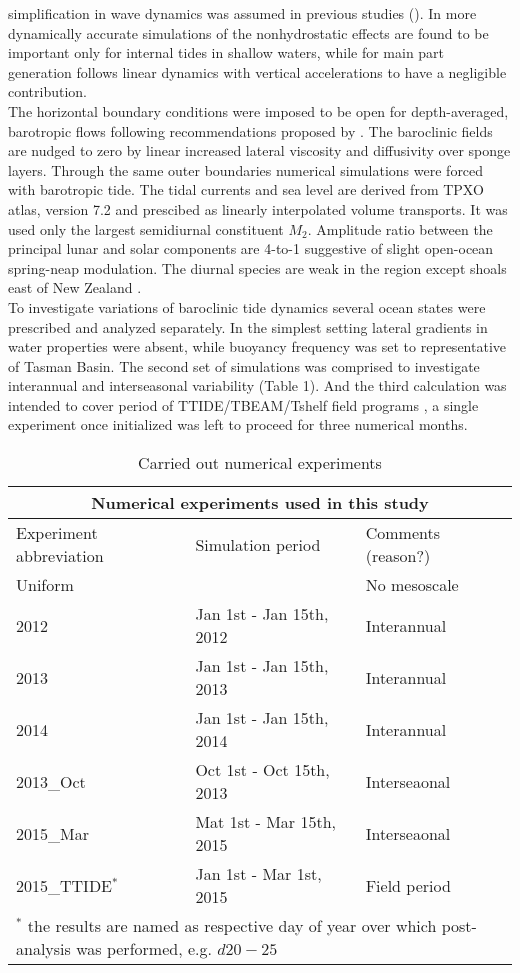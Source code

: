 \documentclass[12pt]{article}
\begin{document}
simplification in wave dynamics was assumed in previous studies (\citep{carter2008energetics, 
merrifield2001generation,  merrifield2002model, kerry2013effects}). In more dynamically accurate   
simulations of \citep{kang2012energetics, zhang2011three} the nonhydrostatic effects are found to 
be important only for internal tides in shallow waters, while for main part generation follows 
linear dynamics with vertical accelerations to have a negligible contribution.\\
The horizontal boundary conditions were imposed to be open for depth-averaged, barotropic flows 
following recommendations proposed by \citep{marchesiello2001open}. The baroclinic fields are 
nudged to zero by linear increased lateral viscosity and diffusivity over sponge layers. Through 
the same outer boundaries numerical simulations were forced with barotropic tide. The tidal 
currents and sea level are derived from TPXO atlas, version 7.2 \citep{egbert2002efficient} and 
prescibed as linearly interpolated volume transports. It was used only the largest semidiurnal 
constituent $M_2$. Amplitude ratio between the principal lunar and solar components are 4-to-1 
suggestive of slight open-ocean spring-neap modulation. The diurnal species are weak in the region 
except shoals east of New Zealand \citep{walters2001ocean}.\\
To investigate variations of baroclinic tide dynamics several ocean states were prescribed and 
analyzed separately. In the simplest setting lateral gradients in water properties were absent, 
while buoyancy frequency was set to representative of Tasman Basin. The second set of simulations 
was comprised to investigate interannual and interseasonal variability (Table 1). And the third 
calculation was intended to cover period of TTIDE/TBEAM/Tshelf field programs 
\citep{pinkel2015breaking}, a single experiment once initialized was left to proceed for three 
numerical months.
\begin{table}
	\caption{Carried out numerical experiments}
	\begin{tabular}{ |p{3cm}||p{5cm}|p{5cm}|  }
		\hline
		\multicolumn{3}{|c|}{Numerical experiments used in this study} \\
		\hline
		Experiment abbreviation & Simulation period & Comments (reason?) \\
		\hline
		Uniform & ~ & No mesoscale \\
		2012 &   Jan 1st - Jan 15th, 2012 & Interannual \\
		2013 &   Jan 1st - Jan 15th, 2013 & Interannual \\
		2014 &   Jan 1st - Jan 15th, 2014 & Interannual \\
		2013\_Oct &   Oct 1st - Oct 15th, 2013 & Interseaonal \\
		2015\_Mar &   Mat 1st - Mar 15th, 2015 & Interseaonal \\
		2015\_TTIDE$^{\ast}$ &   Jan 1st - Mar 1st, 2015 & Field period \\
		\hline
		\multicolumn{3}{|l|}{\footnotesize$^{\ast}$ the results are named as respective day of 
		year over which post-analysis was performed, e.g. $d20-25$ }\\
		\hline
	\end{tabular}
	\label{ch2:table_exp}
\end{table}
\end{document}
